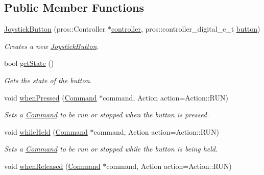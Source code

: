 \subsection*{Public Member Functions}
\begin{DoxyCompactItemize}
\item 
\mbox{\hyperlink{classlib_iterative_robot_1_1_joystick_button_af34169116bcab8a1b5868dddc745e5ec}{Joystick\+Button}} (pros\+::\+Controller $\ast$\mbox{\hyperlink{classlib_iterative_robot_1_1_joystick_button_a092e3793ba078aff20f17b812345fbda}{controller}}, pros\+::controller\+\_\+digital\+\_\+e\+\_\+t \mbox{\hyperlink{classlib_iterative_robot_1_1_joystick_button_a505db434cba7b3ba8e57da5b09ab5efe}{button}})
\begin{DoxyCompactList}\small\item\em Creates a new \mbox{\hyperlink{classlib_iterative_robot_1_1_joystick_button}{Joystick\+Button}}. \end{DoxyCompactList}\item 
bool \mbox{\hyperlink{classlib_iterative_robot_1_1_joystick_button_ac17a3cda9edaf3a38bb87070c47191a1}{get\+State}} ()
\begin{DoxyCompactList}\small\item\em Gets the state of the button. \end{DoxyCompactList}\item 
void \mbox{\hyperlink{classlib_iterative_robot_1_1_joystick_button_ad31d68d951ae4651731881a94515cbbe}{when\+Pressed}} (\mbox{\hyperlink{classlib_iterative_robot_1_1_command}{Command}} $\ast$command, Action action=Action\+::\+R\+UN)
\begin{DoxyCompactList}\small\item\em Sets a \mbox{\hyperlink{classlib_iterative_robot_1_1_command}{Command}} to be run or stopped when the button is pressed. \end{DoxyCompactList}\item 
void \mbox{\hyperlink{classlib_iterative_robot_1_1_joystick_button_abf9016144e1a4e5eaf09183350474081}{while\+Held}} (\mbox{\hyperlink{classlib_iterative_robot_1_1_command}{Command}} $\ast$command, Action action=Action\+::\+R\+UN)
\begin{DoxyCompactList}\small\item\em Sets a \mbox{\hyperlink{classlib_iterative_robot_1_1_command}{Command}} to be run or stopped while the button is being held. \end{DoxyCompactList}\item 
void \mbox{\hyperlink{classlib_iterative_robot_1_1_joystick_button_a9ad5475d1005ee5d76fce97675f88f40}{when\+Released}} (\mbox{\hyperlink{classlib_iterative_robot_1_1_command}{Command}} $\ast$command, Action action=Action\+::\+R\+UN)

\end{DoxyCompactItemize}
